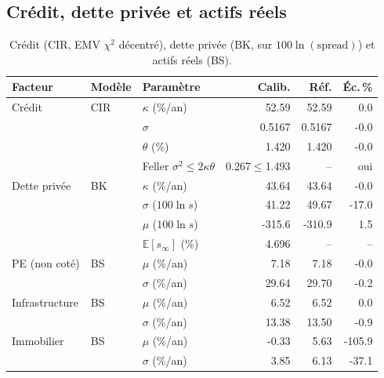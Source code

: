 \documentclass[11pt,a4paper]{article}
\theoremstyle{definition}
\begin{document}
\subsection{Crédit, dette privée et actifs réels}
\begin{table}[H]\centering\small\renewcommand{\arraystretch}{1.2}\setlength{\tabcolsep}{5pt}
\begin{tabularx}{\textwidth}{@{}l l X r r r@{}}
\toprule
\textbf{Facteur} & \textbf{Modèle} & \textbf{Paramètre} & \textbf{Calib.} & \textbf{Réf.} & \textbf{Éc.\,\%}\\
\midrule
Crédit & CIR & $\kappa$ (\%/an) & 52.59 & 52.59 & 0.0\\
 &  & $\sigma$ & 0.5167 & 0.5167 & -0.0\\
 &  & $\theta$ (\%) & 1.420 & 1.420 & -0.0\\
 & & Feller $\sigma^2\le2\kappa\theta$ & 0.267$\le$1.493 & -- & oui\\
\addlinespace
Dette privée & BK & $\kappa$ (\%/an) & 43.64 & 43.64 & -0.0\\
 &  & $\sigma$ ($100\ln s$) & 41.22 & 49.67 & -17.0\\
 &  & $\mu$ ($100\ln s$) & -315.6 & -310.9 & 1.5\\
 & & $\mathbb E[s_\infty]$ (\%) & 4.696 & -- & --\\
\addlinespace
PE (non coté) & BS & $\mu$ (\%/an) & 7.18 & 7.18 & -0.0\\
 &  & $\sigma$ (\%/an) & 29.64 & 29.70 & -0.2\\
Infrastructure & BS & $\mu$ (\%/an) & 6.52 & 6.52 & 0.0\\
 &  & $\sigma$ (\%/an) & 13.38 & 13.50 & -0.9\\
Immobilier & BS & $\mu$ (\%/an) & -0.33 & 5.63 & -105.9\\
 &  & $\sigma$ (\%/an) & 3.85 & 6.13 & -37.1\\
\bottomrule\end{tabularx}
\caption{Crédit (CIR, EMV $\chi^2$ décentré), dette privée (BK, sur $100\ln(\text{spread})$) et actifs réels (BS).}\label{tab:res-margins}
\end{table}
\end{document}

